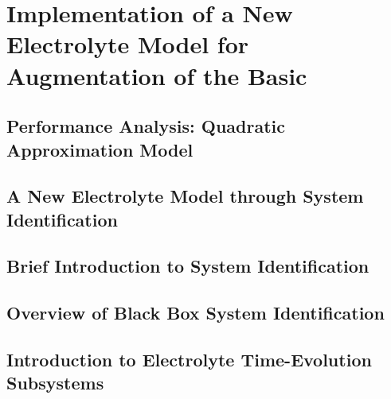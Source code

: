 
\graphicspath{{chapters/sys_id/figures/}}

\clearpage
\chapter{Implementation of a New Electrolyte Model for Augmentation of the Basic }\label{ch:newelectrolytemodel}
\startcontents[chapters]

\bigskip



\section{Performance Analysis: Quadratic Approximation Model}\label{sec:symbolicregression}


\section{A New Electrolyte Model through System Identification}\label{sec:newelectrolytemodel}


\section{Brief Introduction to System Identification}\label{subsec:introsysid}


\section{Overview of Black Box System Identification}\label{sec:introblackboxsysid}


\section{Introduction to Electrolyte Time-Evolution Subsystems}\label{sec:introtoplant}


